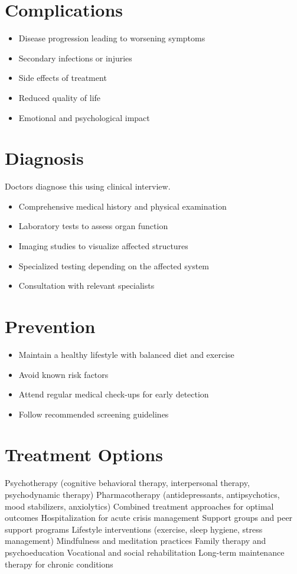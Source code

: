 \section{Complications}
\begin{itemize}[noitemsep]
  \item Disease progression leading to worsening symptoms
  \item Secondary infections or injuries
  \item Side effects of treatment
  \item Reduced quality of life
  \item Emotional and psychological impact
\end{itemize}
\section{Diagnosis}
Doctors diagnose this using clinical interview.

\begin{itemize}[noitemsep]
  \item Comprehensive medical history and physical examination
  \item Laboratory tests to assess organ function
  \item Imaging studies to visualize affected structures
  \item Specialized testing depending on the affected system
  \item Consultation with relevant specialists
\end{itemize}
\section{Prevention}
\begin{itemize}[noitemsep]
  \item Maintain a healthy lifestyle with balanced diet and exercise
  \item Avoid known risk factors
  \item Attend regular medical check-ups for early detection
  \item Follow recommended screening guidelines
\end{itemize}
\section{Treatment Options}
Psychotherapy (cognitive behavioral therapy, interpersonal therapy, psychodynamic therapy) Pharmacotherapy (antidepressants, antipsychotics, mood stabilizers, anxiolytics) Combined treatment approaches for optimal outcomes Hospitalization for acute crisis management Support groups and peer support programs Lifestyle interventions (exercise, sleep hygiene, stress management) Mindfulness and meditation practices Family therapy and psychoeducation Vocational and social rehabilitation Long-term maintenance therapy for chronic conditions

